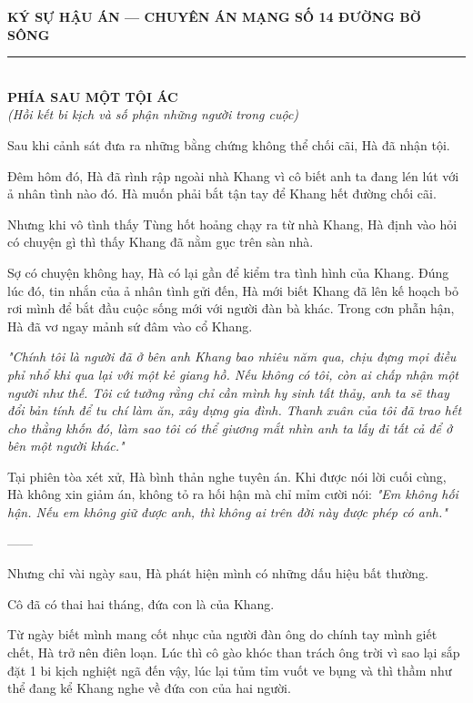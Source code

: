 \documentclass[12pt,a4paper]{article}
\begin{document}
\begin{center}
    \fontsize{12pt}{14pt}\selectfont
    \textbf{KÝ SỰ HẬU ÁN — CHUYÊN ÁN MẠNG SỐ 14 ĐƯỜNG BỜ SÔNG}\\[-0.2em]
    \rule{6cm}{0.6pt}\\[0.5cm]
    \textbf{\Large PHÍA SAU MỘT TỘI ÁC}\\[0.15cm]
    \textit{(Hồi kết bi kịch và số phận những người trong cuộc)}
\end{center}
\vspace{0.3cm}
Sau khi cảnh sát đưa ra những bằng chứng không thể chối cãi, Hà đã nhận tội.


Đêm hôm đó, Hà đã rình rập ngoài nhà Khang vì cô biết anh ta đang lén lút với ả nhân tình nào đó. Hà muốn phải bắt tận tay để Khang hết đường chối cãi.

Nhưng khi vô tình thấy Tùng hốt hoảng chạy ra từ nhà Khang, Hà định vào hỏi có chuyện gì thì thấy Khang đã nằm gục trên sàn nhà.


Sợ có chuyện không hay, Hà có lại gần để kiểm tra tình hình của Khang. Đúng lúc đó, tin nhắn của ả nhân tình gửi đến, Hà mới biết Khang đã lên kế hoạch bỏ rơi mình để bắt đầu cuộc sống mới với người đàn bà khác. Trong cơn phẫn hận, Hà đã vơ ngay mảnh sứ đâm vào cổ Khang.


\textit{"Chính tôi là người đã ở bên anh Khang bao nhiêu năm qua, chịu đựng mọi điều phỉ nhổ khi qua lại với một kẻ giang hồ. Nếu không có tôi, còn ai chấp nhận một người như thế. Tôi cứ tưởng rằng chỉ cần mình hy sinh tất thảy, anh ta sẽ thay đổi bản tính để tu chí làm ăn, xây dựng gia đình. Thanh xuân của tôi đã trao hết cho thằng khốn đó, làm sao tôi có thể giương mắt nhìn anh ta lấy đi tất cả để ở bên một người khác."}


Tại phiên tòa xét xử, Hà bình thản nghe tuyên án. Khi được nói lời cuối cùng, Hà không xin giảm án, không tỏ ra hối hận mà chỉ mỉm cười nói: \textit{"Em không hối hận. Nếu em không giữ được anh, thì không ai trên đời này được phép có anh."}


------


Nhưng chỉ vài ngày sau, Hà phát hiện mình có những dấu hiệu bất thường.


Cô đã có thai hai tháng, đứa con là của Khang.


Từ ngày biết mình mang cốt nhục của người đàn ông do chính tay mình giết chết, Hà trở nên điên loạn. Lúc thì cô gào khóc than trách ông trời vì sao lại sắp đặt 1 bi kịch nghiệt ngã đến vậy, lúc lại tủm tỉm vuốt ve bụng và thì thầm như thể đang kể Khang nghe về đứa con của hai người.
\end{document}
